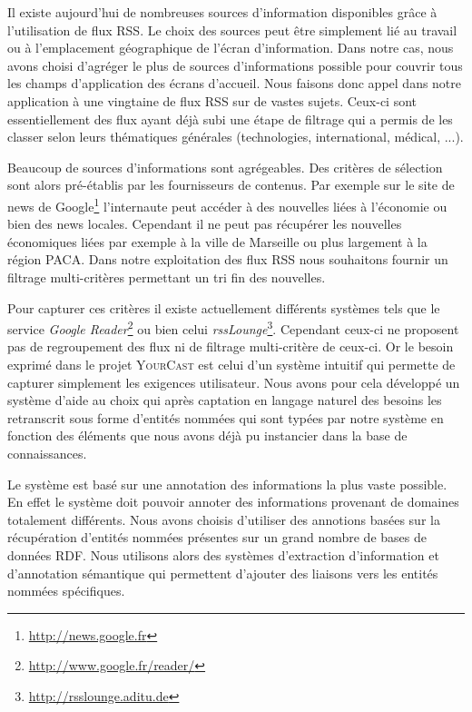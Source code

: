 \documentclass[]{easychair}
\newcommand{\Y}[0]{\textsc{YourCast}\xspace}
\begin{document}
Il existe aujourd'hui de nombreuses sources d'information disponibles grâce à l'utilisation de flux RSS. Le choix des sources peut être simplement lié au travail ou à l'emplacement géographique de l'écran d'information.
Dans notre cas, nous avons choisi d'agréger le plus de sources d'informations possible pour couvrir tous les champs d'application des écrans d'accueil. 
Nous faisons donc appel dans notre application à une vingtaine de flux RSS sur de vastes sujets. Ceux-ci sont essentiellement des flux ayant déjà subi une étape de filtrage qui a permis de les classer selon leurs thématiques générales (technologies, international, médical, ...).

Beaucoup de sources d'informations sont agrégeables. Des critères de sélection sont alors pré-établis par les fournisseurs de contenus.  Par exemple sur le site de news de Google\footnote{\url{http://news.google.fr}} l'internaute peut accéder à des nouvelles liées à l'économie ou bien des news locales. Cependant il ne peut pas récupérer les nouvelles économiques liées par exemple à la ville de Marseille ou plus largement à la région PACA. Dans notre exploitation des flux RSS nous souhaitons fournir un filtrage multi-critères permettant un tri fin des nouvelles. 

Pour capturer ces critères il existe actuellement différents systèmes tels que le service \textsl{Google Reader}\footnote{\url{http://www.google.fr/reader/}} ou bien celui \textsl{rssLounge}\footnote{\url{http://rsslounge.aditu.de}}. Cependant ceux-ci ne proposent pas de regroupement des flux ni de filtrage multi-critère de ceux-ci.
Or le besoin exprimé dans le projet \Y est celui d'un système intuitif qui permette de capturer simplement les exigences utilisateur. Nous avons pour cela développé un système d'aide au choix qui après captation en langage naturel des besoins les retranscrit sous forme d'entités nommées qui sont typées par notre système en fonction des éléments que nous avons déjà pu instancier dans la base de connaissances.

Le système est basé sur une annotation des informations la plus vaste possible. En effet le système doit pouvoir annoter des informations provenant de domaines totalement différents.
Nous avons choisis d'utiliser des annotions basées sur la récupération d'entités nommées présentes sur un grand nombre de bases de données RDF.
Nous utilisons alors des systèmes d'extraction d'information et d'annotation sémantique qui permettent d'ajouter des liaisons vers les entités nommées spécifiques.
\end{document}
